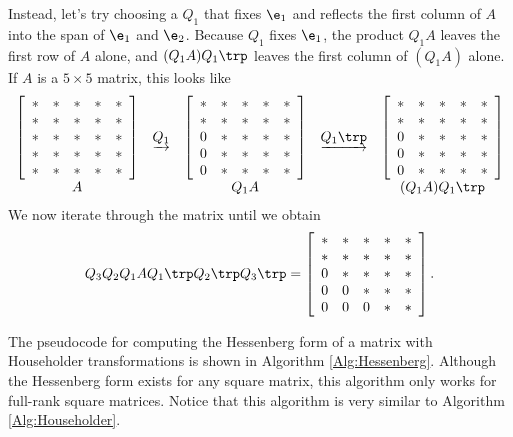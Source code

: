 Instead, let's try choosing a $Q_1$ that fixes $\e_1$ and reflects the first column of $A$ into the span of $\e_1$ and $\e_2$.
Because $Q_1$ fixes $\e_1$, the product $Q_1A$ leaves the first row of $A$ alone, and $(Q_1A)Q_1\trp$ leaves the first column of $(Q_1A)$ alone.
If $A$ is a $5 \times 5$ matrix, this looks like
\[
\begin{array}{ccccc}
\left[\begin{array}{ccccc}
* & * & * & * & * \\
* & * & * & * & * \\
* & * & * & * & * \\
* & * & * & * & * \\
* & * & * & * & *
\end{array}\right]
&\underrightarrow{Q_1}&
\left[\begin{array}{ccccc}
* & * & * & * & * \\
* & * & * & * & * \\
0 & * & * & * & * \\
0 & * & * & * & * \\
0 & * & * & * & *
\end{array}\right]
&\underrightarrow{Q_1\trp }&
\left[\begin{array}{ccccc}
* & * & * & * & * \\
* & * & * & * & * \\
0 & * & * & * & * \\
0 & * & * & * & * \\
0 & * & * & * & *
\end{array}\right]
\\
A & & Q_1A & & (Q_1 A) Q_1\trp
\end{array}
\]
We now iterate through the matrix until we obtain
\begin{equation*}
Q_3 Q_2 Q_1 A Q_1\trp Q_2 \trp Q_3\trp =
\left[\begin{array}{ccccc}
* & * & * & * & * \\
* & * & * & * & * \\
0 & * & * & * & * \\
0 & 0 & * & * & * \\
0 & 0 & 0 & * & *
\end{array}\right].
\end{equation*}

The pseudocode for computing the Hessenberg form of a matrix with Householder transformations is shown in Algorithm \ref{Alg:Hessenberg}.
Although the Hessenberg form exists for any square matrix, this algorithm only works for full-rank square matrices.
Notice that this algorithm is very similar to Algorithm \ref{Alg:Householder}.

